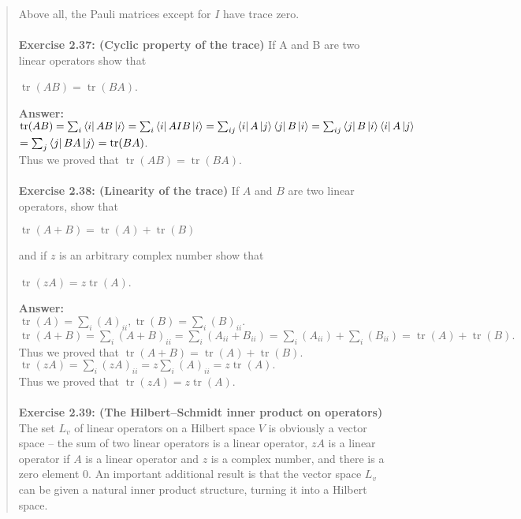 \documentclass[UTF8]{ctexart}
\begin{document}
\begin{quote}
Above all, the Pauli matrices except for $I$ have trace zero.
\\ \\
\textbf{Exercise 2.37: (Cyclic property of the trace) }If A and B are two linear operators show that
		\begin{center}
		$\operatorname{tr}(AB)=\operatorname{tr}(BA)$. 
		\end{center}
	\textbf{Answer:}\\
		$\operatorname{tr}(AB)=\sum_{i}\bra{i}AB\ket{i}=\sum_{i}\bra{i}AIB\ket{i}=\sum_{ij}\bra{i}A\ket{j}\bra{j}B\ket{i}=\sum_{ij}\bra{j}B\ket{i}\bra{i}A\ket{j}$\\
		$=\sum_{j}\bra{j}BA\ket{j}=\operatorname{tr}(BA)$. \\
		Thus we proved that $\operatorname{tr}(AB)=\operatorname{tr}(BA)$. 
		\\ \\
\textbf{Exercise 2.38:  (Linearity of the trace) } If $A$ and $B$ are two linear operators, show that 
		\begin{center}
		$\operatorname{tr}(A+B)=\operatorname{tr}(A)+\operatorname{tr}(B)$ \\
		\end{center}
		and if $z$ is an arbitrary complex number show that
		\begin{center}
		$\operatorname{tr}(zA)=z\operatorname{tr}(A)$. \\
		\end{center}
\textbf{Answer:}\\
$\operatorname{tr}(A)=\sum_{i}(A)_{ii},
\operatorname{tr}(B)=\sum_{i}(B)_{ii}.$
\\
		$\operatorname{tr}(A+B)=\sum_{i}(A+B)_{ii}=\sum_{i}(A_{ii}+B_{ii})=\sum_{i}(A_{ii})+\sum_{i}(B_{ii})
		=\operatorname{tr}(A)+\operatorname{tr}(B).$ \\
		Thus we proved that 	$\operatorname{tr}(A+B)=\operatorname{tr}(A)+\operatorname{tr}(B)$. \\
		$\operatorname{tr}(zA)=\sum_{i}(zA)_{ii}=z\sum_{i}(A)_{ii}=z\operatorname{tr}(A).$ \\
		Thus we proved that $\operatorname{tr}(zA)=z\operatorname{tr}(A)$. \\
	\\ 
\textbf{Exercise 2.39: (The Hilbert–Schmidt inner product on operators)} The set $L_{v}$ of linear operators on a Hilbert space $V$ is obviously a vector space – the sum of two linear operators is a linear operator, $zA$ is a linear operator if $A$ is a linear operator and $z$ is a complex number, and there is a zero element $0$. An important additional result is that the vector space $L_{v}$ can be given a natural inner product structure, turning it into a Hilbert space.\\

\end{quote}
\end{document}
